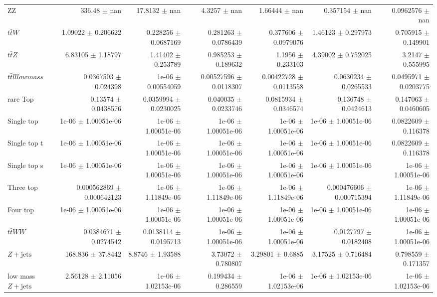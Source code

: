 \begin{table}[H]
\begin{center}
\begin{tabular}{|l|n{5}{2}|n{5}{2}|n{5}{2}|n{5}{2}|n{5}{2}|n{5}{2}|}
  ZZ   & 336.48 $\pm$ nan & 17.8132 $\pm$ nan & 4.3257 $\pm$ nan & 1.66444 $\pm$ nan & 0.357154 $\pm$ nan & 0.0962576 $\pm$ nan \\ 
  $t\bar{t}W$   & 1.09022 $\pm$ 0.206622 & 0.228256 $\pm$ 0.0687169 & 0.281263 $\pm$ 0.0786439 & 0.377606 $\pm$ 0.0979076 & 1.46123 $\pm$ 0.297973 & 0.705915 $\pm$ 0.149901 \\ 
  $t\bar{t}Z$   & 6.83105 $\pm$ 1.18797 & 1.41402 $\pm$ 0.253789 & 0.985253 $\pm$ 0.189632 & 1.1956 $\pm$ 0.233103 & 4.39002 $\pm$ 0.752025 & 3.2147 $\pm$ 0.555995 \\ 
  $t\bar{t}ll low mass$   & 0.0367503 $\pm$ 0.024398 & 1e-06 $\pm$ 0.00554059 & 0.00527596 $\pm$ 0.0118307 & 0.00422728 $\pm$ 0.0113558 & 0.0630234 $\pm$ 0.0265533 & 0.0495971 $\pm$ 0.0203775 \\ 
  rare Top   & 0.13574 $\pm$ 0.0438576 & 0.0359994 $\pm$ 0.0230025 & 0.040035 $\pm$ 0.0233746 & 0.0815934 $\pm$ 0.0346574 & 0.136748 $\pm$ 0.0424613 & 0.147063 $\pm$ 0.0460605 \\ 
  Single top   & 1e-06 $\pm$ 1.00051e-06 & 1e-06 $\pm$ 1.00051e-06 & 1e-06 $\pm$ 1.00051e-06 & 1e-06 $\pm$ 1.00051e-06 & 1e-06 $\pm$ 1.00051e-06 & 0.0822609 $\pm$ 0.116378 \\ 
  Single top t   & 1e-06 $\pm$ 1.00051e-06 & 1e-06 $\pm$ 1.00051e-06 & 1e-06 $\pm$ 1.00051e-06 & 1e-06 $\pm$ 1.00051e-06 & 1e-06 $\pm$ 1.00051e-06 & 0.0822609 $\pm$ 0.116378 \\ 
  Single top s   & 1e-06 $\pm$ 1.00051e-06 & 1e-06 $\pm$ 1.00051e-06 & 1e-06 $\pm$ 1.00051e-06 & 1e-06 $\pm$ 1.00051e-06 & 1e-06 $\pm$ 1.00051e-06 & 1e-06 $\pm$ 1.00051e-06 \\ 
  Three top   & 0.000562869 $\pm$ 0.000642123 & 1e-06 $\pm$ 1.11849e-06 & 1e-06 $\pm$ 1.11849e-06 & 1e-06 $\pm$ 1.11849e-06 & 0.000476606 $\pm$ 0.000715394 & 1e-06 $\pm$ 1.11849e-06 \\ 
  Four top   & 1e-06 $\pm$ 1.00051e-06 & 1e-06 $\pm$ 1.00051e-06 & 1e-06 $\pm$ 1.00051e-06 & 1e-06 $\pm$ 1.00051e-06 & 1e-06 $\pm$ 1.00051e-06 & 1e-06 $\pm$ 1.00051e-06 \\ 
  $t\bar{t}WW$   & 0.0384671 $\pm$ 0.0274542 & 0.0138114 $\pm$ 0.0195713 & 1e-06 $\pm$ 1.00051e-06 & 1e-06 $\pm$ 1.00051e-06 & 0.0127797 $\pm$ 0.0182408 & 1e-06 $\pm$ 1.00051e-06 \\ 
  $Z+\text{jets}$   & 168.836 $\pm$ 37.8442 & 8.8746 $\pm$ 1.93588 & 3.73072 $\pm$ 0.780807 & 3.29801 $\pm$ 0.6885 & 3.17525 $\pm$ 0.716484 & 0.798559 $\pm$ 0.171357 \\ 
  low mass $Z+\text{jets}$   & 2.56128 $\pm$ 2.11056 & 1e-06 $\pm$ 1.02153e-06 & 0.199434 $\pm$ 0.286559 & 1e-06 $\pm$ 1.02153e-06 & 1e-06 $\pm$ 1.02153e-06 & 1e-06 $\pm$ 1.02153e-06 \\ 

\end{tabular}
\end{center}
\end{table}
